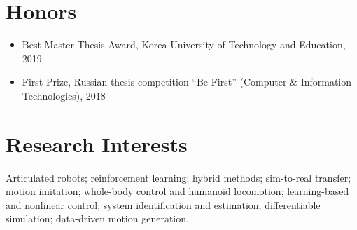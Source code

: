 \documentclass[11pt,a4paper]{article}
\begin{document}
\section{Honors}

\begin{itemize}[leftmargin=*, nosep, topsep=0.2em]
  \item Best Master Thesis Award, Korea University of Technology and Education, 2019
  \item First Prize, Russian thesis competition ``Be-First'' (Computer \& Information Technologies), 2018
\end{itemize}

\section{Research Interests}

Articulated robots; reinforcement learning; hybrid methods; sim-to-real transfer; motion imitation; whole-body control and humanoid locomotion; learning-based and nonlinear control; system identification and estimation; differentiable simulation; data-driven motion generation.
\end{document}
